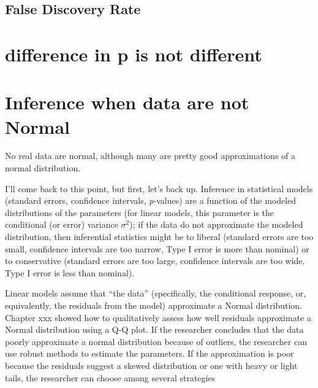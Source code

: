 \documentclass[]{book}
\begin{document}
\hypertarget{false-discovery-rate-1}{%
\subsection{False Discovery Rate}\label{false-discovery-rate-1}}

\hypertarget{difference-in-p-is-not-different}{%
\section{difference in p is not different}\label{difference-in-p-is-not-different}}

\hypertarget{inference-when-data-are-not-normal}{%
\section{Inference when data are not Normal}\label{inference-when-data-are-not-normal}}

No real data are normal, although many are pretty good approximations of a normal distribution.

I'll come back to this point, but first, let's back up. Inference in statistical models (standard errors, confidence intervals, \emph{p}-values) are a function of the modeled distributions of the parameters (for linear models, this parameter is the conditional (or error) variance \(\sigma^2\)); if the data do not approximate the modeled distribution, then inferential statistics might be to liberal (standard errors are too small, confidence intervals are too narrow, Type I error is more than nominal) or to conservative (standard errors are too large, confidence intervals are too wide, Type I error is less than nominal).

Linear models assume that ``the data'' (specifically, the conditional response, or, equivalently, the residuals from the model) approximate a Normal distribution. Chapter xxx showed how to qualitatively assess how well residuals approximate a Normal distribution using a Q-Q plot. If the researcher concludes that the data poorly approximate a normal distribution because of outliers, the researcher can use robust methods to estimate the parameters. If the approximation is poor because the residuals suggest a skewed distribution or one with heavy or light tails, the researcher can choose among several strategies
\end{document}

